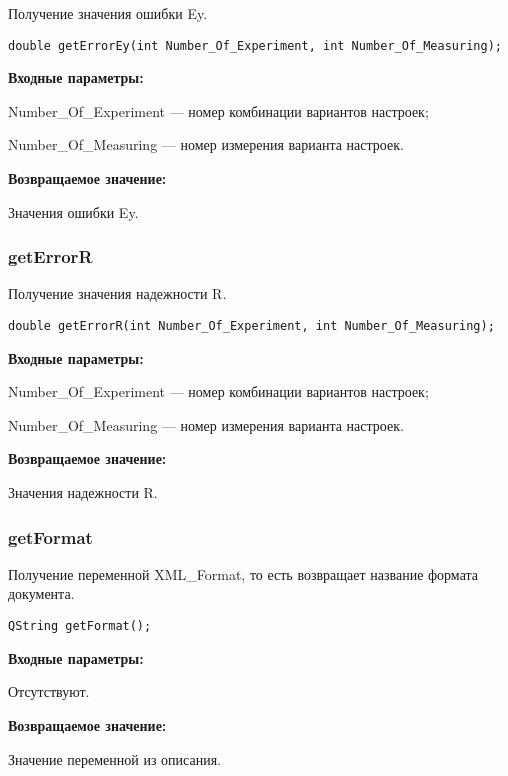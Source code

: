 \documentclass[a4paper,12pt]{article}
\begin{document}
Получение значения ошибки Ey.


\begin{lstlisting}[label=code_syntax_getErrorEy,caption=Синтаксис]
double getErrorEy(int Number_Of_Experiment, int Number_Of_Measuring);
\end{lstlisting}

\textbf{Входные параметры:}

Number\_Of\_Experiment --- номер комбинации вариантов настроек;
 
    Number\_Of\_Measuring --- номер измерения варианта настроек.

\textbf{Возвращаемое значение:}

 
Значения ошибки Ey.


\subsubsection{getErrorR}\label{getErrorR}

Получение значения надежности R.


\begin{lstlisting}[label=code_syntax_getErrorR,caption=Синтаксис]
double getErrorR(int Number_Of_Experiment, int Number_Of_Measuring);
\end{lstlisting}

\textbf{Входные параметры:}

Number\_Of\_Experiment --- номер комбинации вариантов настроек;
 
    Number\_Of\_Measuring --- номер измерения варианта настроек.

\textbf{Возвращаемое значение:}

 
Значения надежности R.


\subsubsection{getFormat}\label{getFormat}

Получение переменной XML\_Format, то есть возвращает название формата документа.


\begin{lstlisting}[label=code_syntax_getFormat,caption=Синтаксис]
QString getFormat();
\end{lstlisting}

\textbf{Входные параметры:}

Отсутствуют.

\textbf{Возвращаемое значение:}

Значение переменной из описания.
\end{document}
